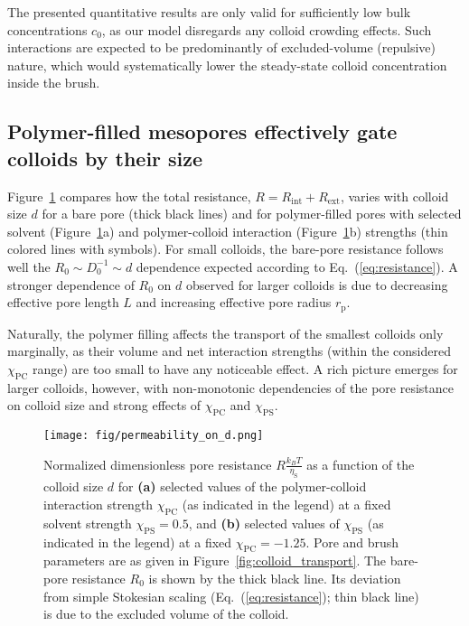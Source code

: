 \documentclass[12pt, a4paper]{article}
\begin{document}
The presented quantitative results are only valid for sufficiently low bulk concentrations $c_0$, as our model disregards any colloid crowding effects.
Such interactions are expected to be predominantly of excluded-volume (repulsive) nature, which would systematically lower the steady-state colloid concentration inside the brush.


\subsection{Polymer-filled mesopores effectively gate colloids by their size}

Figure~\ref{fig:R_vs_d} compares how the total resistance, $R=R_\text{int}+R_\text{ext}$, varies with colloid size $d$ for a bare pore (thick black lines) and for polymer-filled pores with selected solvent (Figure~\ref{fig:R_vs_d}a) and polymer-colloid interaction (Figure~\ref{fig:R_vs_d}b) strengths (thin colored lines with symbols).
For small colloids, the bare-pore resistance follows well the $R_0 \sim D_0^{-1} \sim d$ dependence expected according to Eq.~(\ref{eq:resistance}).
A stronger dependence of $R_0$ on $d$ observed for larger colloids is due to decreasing effective pore length $L$ and increasing effective pore radius $r_\text{p}$.

Naturally, the polymer filling affects the transport of the smallest colloids only marginally, as their volume and net interaction strengths (within the considered $\chi_{\text{PC}}$ range) are too small to have any noticeable effect. 
A rich picture emerges for larger colloids, however, with non-monotonic dependencies of the pore resistance on colloid size and strong effects of $\chi_{\text{PC}}$ and $\chi_{\text{PS}}$. 

\begin{figure}
    \centering
    \texttt{[image: fig/permeability\_on\_d.png]}
    \caption{
    Normalized dimensionless pore resistance $R\tfrac{k_{B}T}{\eta_{\text{S}}} $ as a function of the colloid size $d$ for \textbf{(a)} selected values of the polymer-colloid interaction strength $\chi_{\text{PC}}$ (as indicated in the legend) at a fixed solvent strength $\chi_{\text{PS}} =0.5$, and \textbf{(b)} selected values of $\chi_{\text{PS}}$ (as indicated in the legend) at a fixed $\chi_{\text{PC}} = -1.25$.
    Pore and brush parameters are as given in Figure~\ref{fig:colloid_transport}. 
    The bare-pore resistance $R_{0}$ is shown by the thick black line.
    Its deviation from simple Stokesian scaling (Eq.~(\ref{eq:resistance}); thin black line) is due to the excluded volume of the colloid.
    }
    \label{fig:R_vs_d}
\end{figure}
\end{document}
